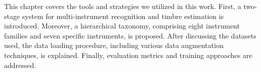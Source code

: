 This chapter covers the tools and strategies we utilized in this work. First, a two-stage system for multi-instrument recognition and timbre estimation is introduced. Moreover, a hierarchical taxonomy, comprising eight instrument families and seven specific instruments, is proposed. After discussing the datasets used, the data loading procedure, including various data augmentation techniques, is explained. Finally, evaluation metrics and training approaches are addressed.
